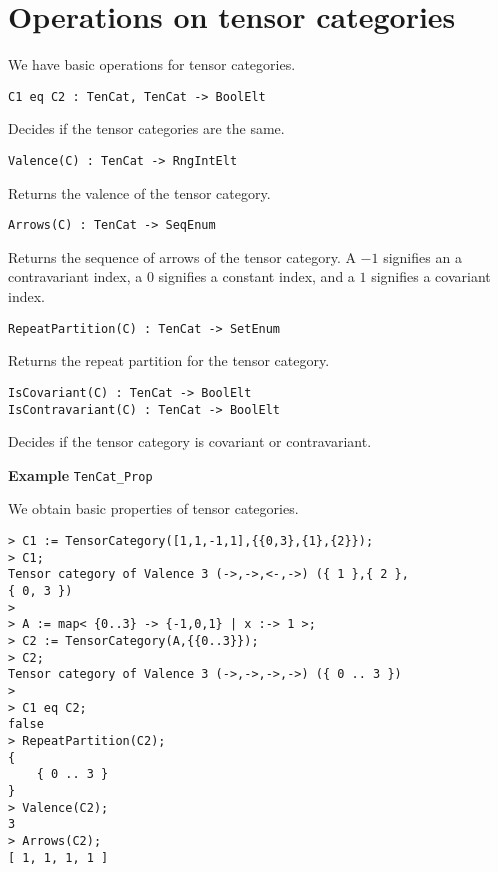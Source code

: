 \section{Operations on tensor categories}

We have basic operations for tensor categories.

\color{blue}
{\small \begin{verbatim}
C1 eq C2 : TenCat, TenCat -> BoolElt
\end{verbatim} }
\color{black}

Decides if the tensor categories are the same.

\color{blue}
{\small \begin{verbatim}
Valence(C) : TenCat -> RngIntElt
\end{verbatim} }
\color{black}

Returns the valence of the tensor category.

\color{blue}
{\small \begin{verbatim}
Arrows(C) : TenCat -> SeqEnum
\end{verbatim} }
\color{black}

Returns the sequence of arrows of the tensor category. 
A $-1$ signifies an a contravariant index, a $0$ signifies a constant index, and a $1$ signifies a covariant index.

\color{blue}
{\small \begin{verbatim}
RepeatPartition(C) : TenCat -> SetEnum
\end{verbatim} }
\color{black}

Returns the repeat partition for the tensor category.

\color{blue}
{\small \begin{verbatim}
IsCovariant(C) : TenCat -> BoolElt
IsContravariant(C) : TenCat -> BoolElt
\end{verbatim} }
\color{black}

Decides if the tensor category is covariant or contravariant.

\begin{framed}{\bf Example} {\tt TenCat\_Prop}\\
{\small We obtain basic properties of tensor categories.
\begin{lstlisting}[frame=single,basicstyle=\ttfamily\color{black!30!
teal},backgroundcolor=\color{white!70!gray}]
> C1 := TensorCategory([1,1,-1,1],{{0,3},{1},{2}});
> C1;
Tensor category of Valence 3 (->,->,<-,->) ({ 1 },{ 2 },
{ 0, 3 })
> 
> A := map< {0..3} -> {-1,0,1} | x :-> 1 >;
> C2 := TensorCategory(A,{{0..3}});
> C2;
Tensor category of Valence 3 (->,->,->,->) ({ 0 .. 3 })
> 
> C1 eq C2;
false
> RepeatPartition(C2);
{
    { 0 .. 3 }
}
> Valence(C2);
3
> Arrows(C2);
[ 1, 1, 1, 1 ]
\end{lstlisting}
}
\end{framed}

